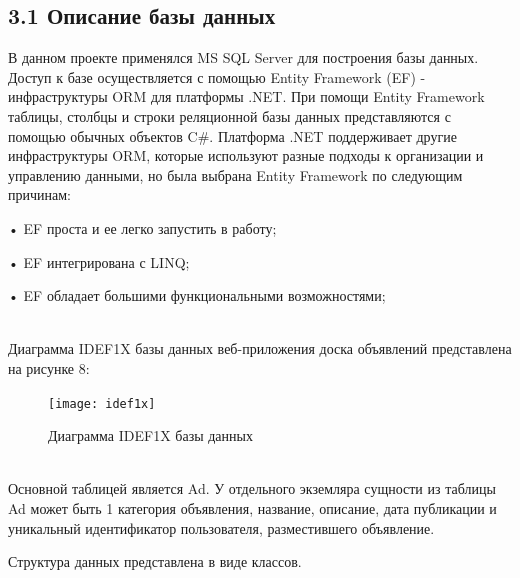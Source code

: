 \documentclass[14pt,a4paper]{extreport}
\begin{document}
	\subsection*{\normalsize\hspace{4ex}3.1 Описание базы данных}
	\parindent=1cm В данном проекте применялся MS SQL Server для построения базы данных. Доступ к базе осуществляется с помощью Entity Framework (EF) - инфраструктуры ORM для платформы .NET. При помощи Entity Framework таблицы, столбцы и строки реляционной базы данных представляются с помощью обычных объектов C\#. Платформа .NET поддерживает другие инфраструктуры ORM, которые используют разные подходы к орга\-низации и управлению данными, но была выбрана Entity Framework по следующим причинам:\par
	• EF проста и ее легко запустить в работу;\par
	• EF интегрирована с LINQ;\par
	• EF обладает большими функциональными возможностями;\par
	~\\ 
	 Диаграмма IDEF1X базы данных веб-приложения доска объявлений представлена на рисунке 8:
	\begin{figure}[h]
	\begin{center}
	\texttt{[image: idef1x]}
	\caption{ Диаграмма IDEF1X базы данных}
	\end{center}
	\end{figure}
	~\\
	Основной таблицей является Ad. У отдельного экземляра сущности из таблицы Ad может быть 1 категория объявления, название, описание, дата публикации и уникальный идентификатор пользователя, разместившего объявление.\par
	Структура данных представлена в виде классов.\par

\end{document}
